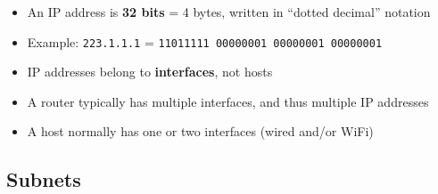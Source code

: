 \begin{keybox}
\begin{itemize}[noitemsep]
    \item An IP address is \textbf{32 bits} = 4 bytes, written in ``dotted decimal'' notation
    \item Example: \texttt{223.1.1.1} = \texttt{11011111 00000001 00000001 00000001}
    \item IP addresses belong to \textbf{interfaces}, not hosts
    \item A router typically has multiple interfaces, and thus multiple IP addresses
    \item A host normally has one or two interfaces (wired and/or WiFi)
\end{itemize}
\end{keybox}

\subsection{Subnets}

